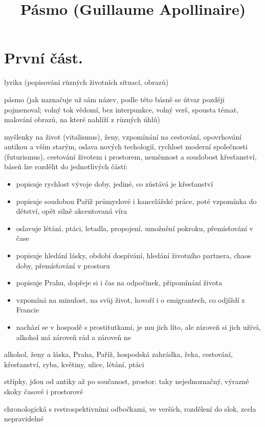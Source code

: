 \documentclass{article}
\title{\vspace{-2cm}Pásmo (Guillaume Apollinaire)\vspace{-2cm}}
\date{}
\author{}
\begin{document}
\maketitle
\section{První část.}
\begin{description}
    \setlength\itemsep{0.15em}
    \item[druh:] lyrika (popisování různých životních situací, obrazů)
    \item[žánr:] pásmo (jak naznačuje už sám název, podle této básně se útvar později pojmenoval; volný tok vědomí, bez interpunkce, volný verš, spousta témat, malování obrazů, na které nahlíží z různých úhlů)
    \item[téma:] myšlenky na život (vitalismus), ženy, vzpomínání na cestování, opovrhování antikou a vším starým, oslava nových techologií, rychlost moderní společnosti (futurismus), cestování životem i prostorem, neměnnost a soudobost křesťanství, báseň lze rozdělit do jednotlivých částí:
    \begin{itemize}
      \item popisuje rychlost vývoje doby, jediné, co zůstává je křesťanství
      \item popisuje soudobou Paříž průmyslové i kancelářské práce, poté vzpomínka do dětství, opět silně akcentovaná víra
      \item oslavuje létání, ptáci, letadla, propojení, umožnění pokroku, přemísťování v čase
      \item popisuje hledání lásky, období dospívání, hledání životního partnera, chaos doby, přemísťování v prostoru
      \item popisuje Prahu, dopřeje si i čas na odpočinek, připomínání života
      \item vzpomíná na minulost, na svůj život, hovoří i o emigrantech, co odjíždí z Francie
      \item nachází se v hospodě s prostitutkami, je mu jich líto, ale zároveň si jich užívá, alkohol má zároveň rád a zároveň ne
    \end{itemize}
    \item[motivy:] alkohol, ženy a láska, Praha, Paříž, hospodská zahrádka, řeka, cestování, křesťanství, ryba, květiny, ulice, létání, ptáci
    \item[časoprostor:] střípky, jdou od antiky až po součanost, prostor: taky nejednoznačný, výrazné skoky časové i prostorové
    \item[kompoziční výstavba:] chronologická s restrospektivními odbočkami, ve verších, rozdělení do slok, zcela nepravidelné
\end{description}
\end{document}
